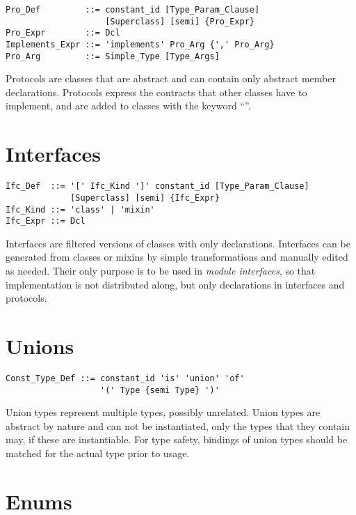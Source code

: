 \syntax\begin{lstlisting}
Pro_Def         ::= constant_id [Type_Param_Clause]
                    [Superclass] [semi] {Pro_Expr}
Pro_Expr        ::= Dcl
Implements_Expr ::= 'implements' Pro_Arg {',' Pro_Arg}
Pro_Arg         ::= Simple_Type [Type_Args]
\end{lstlisting}


Protocols are classes that are abstract and can contain only abstract member declarations. Protocols express the contracts that other classes have to implement, and are added to classes with the keyword ``''. 

\section{Interfaces}
\label{sec:interfaces}

\syntax\begin{lstlisting}
Ifc_Def  ::= '[' Ifc_Kind ']' constant_id [Type_Param_Clause] 
             [Superclass] [semi] {Ifc_Expr}
Ifc_Kind ::= 'class' | 'mixin'
Ifc_Expr ::= Dcl
\end{lstlisting}

Interfaces are filtered versions of classes with only declarations. Interfaces can be generated from classes or mixins by simple transformations and manually edited as needed. Their only purpose is to be used in {\em module interfaces}, so that implementation is not distributed along, but only declarations in interfaces and protocols. 

\section{Unions}
\label{sec:unions}

\syntax\begin{lstlisting}
Const_Type_Def ::= constant_id 'is' 'union' 'of'
                   '(' Type {semi Type} ')'
\end{lstlisting}

Union types represent multiple types, possibly unrelated. Union types are abstract by nature and can not be instantiated, only the types that they contain may, if these are instantiable. For type safety, bindings of union types should be matched for the actual type prior to usage. 

\section{Enums}
\label{sec:enums}

